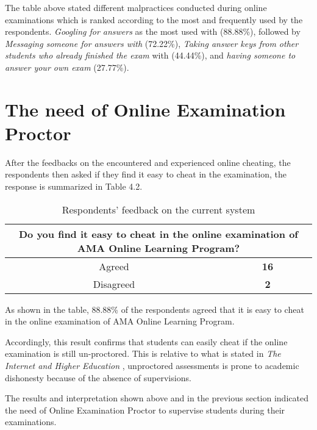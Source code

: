 The table above stated different malpractices conducted during online examinations which is ranked according to the most and frequently used by the respondents.
\emph{Googling for answers} as the most used with (88.88\%), followed by \emph{Messaging someone for answers with} (72.22\%), \emph{Taking answer keys from other students who already finished the exam} with (44.44\%), and \emph{having someone to answer your own exam} (27.77\%).

\section{The need of Online Examination Proctor}

After the feedbacks on the encountered and experienced online cheating, the respondents then asked if they find it easy to cheat in the examination, the response is summarized in Table 4.2.

\begin{table}[h!]
   \begin{center}
      \begin{tabular}{|c|c|}
         \hline
         \multicolumn{2}{|m{20em}|}{Do you find it easy to cheat in the online examination of AMA Online Learning Program?} \\
         \hline
         Agreed    & \textbf{16}                                                                                            \\
         \hline
         Disagreed & \textbf{2}                                                                                             \\
         \hline
      \end{tabular}
   \end{center}
   \caption{Respondents’ feedback on the current system}
\end{table}

As shown in the table, 88.88\% of the respondents agreed that it is easy to cheat in the online examination of AMA Online Learning Program.

Accordingly, this result confirms that students can easily cheat if the online examination is still un-proctored.
This is relative to what is stated in \emph{The Internet and Higher Education} \cite{arnold2016cheating}, unproctored assessments is prone to academic dishonesty because of the absence of supervisions.

The results and interpretation shown above and in the previous section indicated the need of Online Examination Proctor to supervise students during their examinations.

